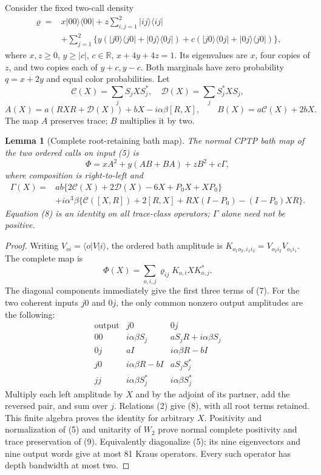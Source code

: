 \documentclass[11pt]{article}
\newtheorem{lemma}[theorem]{Lemma}
\newcommand{\ket}[1]{\lvert #1\rangle}
\newcommand{\bra}[1]{\langle #1\rvert}
\begin{document}
Consider the fixed two-call density
\[
\begin{split}
 \varrho={}&x|00\rangle\langle00|
 +z\sum_{i,j=1}^2|ij\rangle\langle ij|\\
 &+\sum_{j=1}^2\{y(|j0\rangle\langle j0|+|0j\rangle\langle0j|)
 +c(|j0\rangle\langle0j|+|0j\rangle\langle j0|)\},
\end{split}\tag{5}
\]
where $x,z\ge0$, $y\ge|c|$, $c\in\mathbb R$, $x+4y+4z=1$.
Its eigenvalues are $x$, four copies of $z$, and two copies each of $y+c,y-c$.
Both marginals have zero probability $q=x+2y$ and equal color probabilities.
Let
\[
 \mathcal C(X)=\sum_jS_jXS_j^*,\quad
 \mathcal D(X)=\sum_jS_j^*XS_j,
\]
\[
 A(X)=a(RXR+\mathcal D(X))+bX-i\alpha\beta[R,X],\qquad
 B(X)=a\mathcal C(X)+2bX.
 \tag{6}
\]
The map $A$ preserves trace; $B$ multiplies it by two.

\begin{lemma}[Complete root-retaining bath map]\label{lem:map}
The normal CPTP bath map of the two ordered calls on input (5) is
\[
 \Phi=xA^2+y(AB+BA)+zB^2+c\Gamma,
 \tag{7}
\]
where composition is right-to-left and
\[
\begin{split}
 \Gamma(X)={}&ab\{2\mathcal C(X)+2\mathcal D(X)-6X+P_0X+XP_0\}\\
 &+i\alpha^3\beta\{\mathcal C([X,R])+2[R,X]
                  +RX(I-P_0)-(I-P_0)XR\}.
\end{split}\tag{8}
\]
Equation (8) is an identity on all trace-class operators; $\Gamma$ alone
need not be positive.
\end{lemma}
\begin{proof}
Writing $V_{oi}=\bra oV\ket i$, the ordered bath amplitude is
$K_{o_1o_2,i_1i_2}=V_{o_2i_2}V_{o_1i_1}$. The complete map is
\[
 \Phi(X)=\sum_{o,i,j}\varrho_{ij}K_{o,i}XK_{o,j}^*.
 \tag{9}
\]
The diagonal components immediately give the first three terms of (7).
For the two coherent inputs $j0$ and $0j$, the only common nonzero output
amplitudes are the following:
\[
\begin{array}{c|cc}
 \text{output}&j0&0j\\\hline
 00&i\alpha\beta S_j&aS_jR+i\alpha\beta S_j\\
 0j&aI&i\alpha\beta R-bI\\
 j0&i\alpha\beta R-bI&aS_jS_j^*\\
 jj&i\alpha\beta S_j^*&i\alpha\beta S_j^*
\end{array}\tag{10}
\]
Multiply each left amplitude by $X$ and by the adjoint of its partner, add
the reversed pair, and sum over $j$. Relations (2) give (8), with all root
terms retained. This finite algebra proves the identity for arbitrary $X$.
Positivity and normalization of (5) and unitarity of $W_2$ prove normal
complete positivity and trace preservation of (9). Equivalently diagonalize
(5); its nine eigenvectors and nine output words give at most 81 Kraus
operators. Every such operator has depth bandwidth at most two.
\end{proof}
\end{document}
